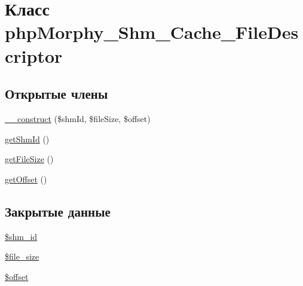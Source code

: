 \hypertarget{classphpMorphy__Shm__Cache__FileDescriptor}{
\section{Класс phpMorphy\_\-Shm\_\-Cache\_\-FileDescriptor}
\label{classphpMorphy__Shm__Cache__FileDescriptor}
}
\subsection*{Открытые члены}
\begin{DoxyCompactItemize}
\item 
\hyperlink{classphpMorphy__Shm__Cache__FileDescriptor_a3148c6d99383af769191518d3a04c388}{\_\-\_\-construct} (\$shmId, \$fileSize, \$offset)
\item 
\hyperlink{classphpMorphy__Shm__Cache__FileDescriptor_a881a69f05512bf19698d61b9c585b864}{getShmId} ()
\item 
\hyperlink{classphpMorphy__Shm__Cache__FileDescriptor_a22c11376384fd57eb2a70383207d08c9}{getFileSize} ()
\item 
\hyperlink{classphpMorphy__Shm__Cache__FileDescriptor_ad9ad0a89bbab5ddc1db9ce9efd8053d5}{getOffset} ()
\end{DoxyCompactItemize}
\subsection*{Закрытые данные}
\begin{DoxyCompactItemize}
\item 
\hyperlink{classphpMorphy__Shm__Cache__FileDescriptor_a89a1e5515a1f26f6607b72f8f046c782}{\$shm\_\-id}
\item 
\hyperlink{classphpMorphy__Shm__Cache__FileDescriptor_a0a67bfc8dd15ebd21a254a76882c35bc}{\$file\_\-size}
\item 
\hyperlink{classphpMorphy__Shm__Cache__FileDescriptor_a82c0d604fc2d2626a12e6272f658b990}{\$offset}
\end{DoxyCompactItemize}


